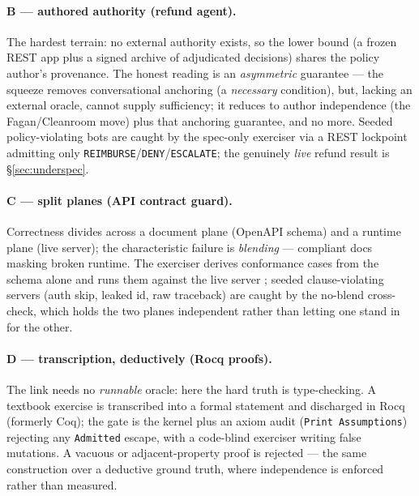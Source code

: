 \documentclass[11pt]{article}
\newcommand{\code}[1]{\texttt{#1}}
\begin{document}
\paragraph{B --- authored authority (refund agent).}\label{sec:caseE} The hardest terrain: no external
authority exists, so the lower bound (a frozen REST app plus a signed archive of \ResBArchiveCases{}
adjudicated decisions) shares the policy author's provenance. The honest reading is an \emph{asymmetric}
guarantee --- the squeeze removes conversational anchoring (a \emph{necessary} condition), but, lacking
an external oracle, cannot supply sufficiency; it reduces to author independence (the Fagan/Cleanroom
move) plus that anchoring guarantee, and no more. Seeded policy-violating bots
\citep{perez2022ignore,greshake2023injection} are caught by the spec-only exerciser via a REST lockpoint
admitting only \texttt{REIMBURSE}/\texttt{DENY}/\texttt{ESCALATE}; the genuinely \emph{live} refund
result is \S\ref{sec:underspec}.

\paragraph{C --- split planes (API contract guard).}\label{sec:caseF} Correctness divides across a
document plane (OpenAPI schema) and a runtime plane (live server); the characteristic failure is
\emph{blending} --- compliant docs masking broken runtime. The exerciser derives \ResCTestCases{}
conformance cases from the schema alone and runs them against the live server
\citep{atlidakis2019restler}; seeded clause-violating servers (auth skip, leaked id, raw traceback) are
caught by the no-blend cross-check, which holds the two planes independent rather than letting one stand
in for the other.

\paragraph{D --- transcription, deductively (Rocq proofs).}\label{sec:caseG} The link needs no
\emph{runnable} oracle: here the hard truth is type-checking. A textbook exercise is transcribed into a
formal statement and discharged in Rocq (formerly Coq); the gate is the kernel plus an axiom audit
(\code{Print Assumptions}) rejecting any \code{Admitted} escape, with a code-blind exerciser writing
false mutations. A vacuous or adjacent-property proof is rejected --- the same construction over a
deductive ground truth, where independence is enforced rather than measured.
\end{document}
